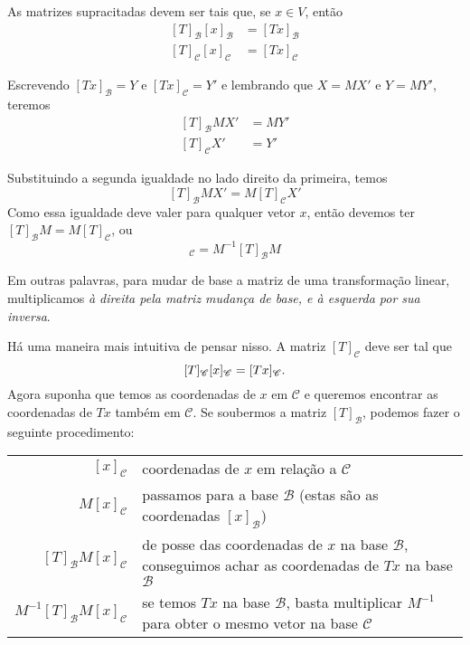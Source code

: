 \documentclass[a4paper,11pt]{article}
\newcommand{\V}{V}
\newcommand{\B}{\mathscr{B}}
\newcommand{\C}{\mathscr{C}}
\begin{document}
As matrizes supracitadas devem ser tais que, se $x \in \V$, então
\begin{equation}
\begin{split}
    [T]_\B [x]_\B &= [Tx]_\B \\
    [T]_\C [x]_\C &= [Tx]_\C
\end{split}
\end{equation}

Escrevendo $[Tx]_\B = Y$ e $[Tx]_\C = Y'$ e lembrando que $X = MX'$ e $Y = MY'$, teremos
\begin{equation}
\begin{split}
    [T]_\B MX' &= MY' \\
    [T]_\C X'  &=  Y'
\end{split}
\end{equation}

Substituindo a segunda igualdade no lado direito da primeira, temos
\[
    [T]_\B MX' = M [T]_\C X'
\]
Como essa igualdade deve valer para qualquer vetor $x$, então devemos ter $[T]_\B M = M [T]_\C$, ou
\begin{equation}
    [T]_\C = M^{-1} [T]_\B M
\end{equation}

Em outras palavras, para mudar de base a matriz de uma transformação linear, multiplicamos \emph{à direita pela matriz mudança de base, e à esquerda por sua inversa}.

Há uma maneira mais intuitiva de pensar nisso.  A matriz $[T]_\C$ deve ser tal que
\[
    [T]_\C [x]_\C = [Tx]_\C  \text.
\]
Agora suponha que temos as coordenadas de $x$ em $\C$ e queremos encontrar as coordenadas de $Tx$ também em $\C$.  Se soubermos a matriz $[T]_\B$, podemos fazer o seguinte procedimento:

\renewcommand{\arraystretch}{1.5}
\begin{table}[H]
  \centering
  \begin{tabular}{rp{10cm}}
    $[x]_\C$   
                &  coordenadas de $x$ em relação a $\C$ \\
    $M[x]_\C$
                &  passamos para a base $\B$ (estas são as coordenadas $[x]_\B$) \\
    $[T]_\B M [x]_\C$
                &  de posse das coordenadas de $x$ na base $\B$, conseguimos
                   achar as coordenadas de $Tx$ na base $\B$ \\
    $M^{-1} [T]_\B M [x]_\C$
                &  se temos $Tx$ na base $\B$, basta multiplicar $M^{-1}$ para
                   obter o mesmo vetor na base $\C$ \\
  \end{tabular}
\end{table}
\end{document}
